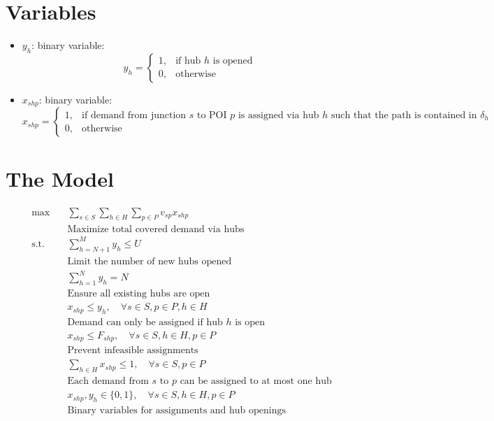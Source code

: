 \documentclass{article}
\begin{document}
\section{Variables}
\begin{itemize}[leftmargin=*,nosep]
    \item $y_h$: binary variable:
        \[
        y_h = \begin{cases} 
        1, & \text{if hub } h \text{ is opened} \\
        0, & \text{otherwise}
        \end{cases}
        \]
    \item $x_{shp}$: binary variable:
        \[
        x_{shp} = \begin{cases} 
        1, & \text{if demand from junction } s \text{ to POI } p \text{ is assigned via hub } h \text{ such that the path is contained in } \delta_h \\
        0, & \text{otherwise}
        \end{cases}
        \]
\end{itemize}

\section{The Model}
\begin{align*}
    \max \quad & \sum_{s \in S} \sum_{h \in H} \sum_{p \in P} v_{sp} x_{shp} \\
    & \text{Maximize total covered demand via hubs} \\[6pt]
    \text{s.t.} \quad & \sum_{h = N+1}^{M} y_h \leq U \\
    & \text{Limit the number of new hubs opened} \\[6pt]
    & \sum_{h = 1}^{N} y_h = N \\
    & \text{Ensure all existing hubs are open} \\[6pt]
    & x_{shp} \leq y_h, \quad \forall s \in S, p \in P, h \in H \\
    & \text{Demand can only be assigned if hub } h \text{ is open} \\[6pt]
    & x_{shp} \leq F_{shp}, \quad \forall s \in S, h \in H, p \in P \\
    & \text{Prevent infeasible assignments} \\[6pt]
    & \sum_{h \in H} x_{shp} \leq 1, \quad \forall s \in S, p \in P \\
    & \text{Each demand from } s \text{ to } p \text{ can be assigned to at most one hub} \\[6pt]
    & x_{shp}, y_h \in \{0, 1\}, \quad \forall s \in S, h \in H, p \in P \\
    & \text{Binary variables for assignments and hub openings}
\end{align*}
\end{document}
